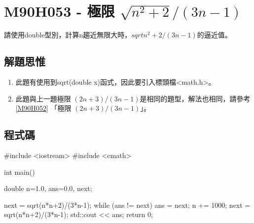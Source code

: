 \section{M90H053 - 極限 $\sqrt{n^2+2}/(3n-1)$}
請使用double型別，計算n趨近無限大時，$sqrt{n^2+2}/(3n-1)$的逼近值。

\subsection{解題思惟}

\begin{enumerate}
	
	\item 此題有使用到sqrt(double x)函式，因此要引入標頭檔<math.h>。
	\item 此題與上一題極限 $(2n+3)/(3n-1)$是相同的題型，解法也相同，請參考
	\ref{M90H052}
	「極限 $(2n+3)/(3n-1)$」。
\end{enumerate}

\subsection{程式碼}
\begin{cppcode}
#include <iostream>
#include <cmath>

int main()
{
	double n=1.0, ans=0.0, next;
	
	next = sqrt(n*n+2)/(3*n-1);
	while (ans != next) {
		ans = next;
		n += 1000;
		next = sqrt(n*n+2)/(3*n-1);
	}
	std::cout << ans;
	return 0;
}
\end{cppcode}
